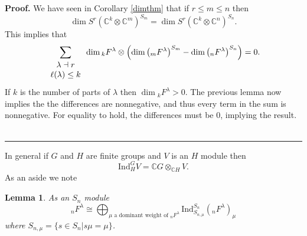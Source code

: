 \documentclass[12pt]{article}%
\newtheorem{lemma}[theorem]{Lemma}
\newenvironment{proof}[1][Proof]{\noindent\textbf{#1.} }{\ \rule{0.5em}{0.5em}}
\begin{document}
\begin{proof}
We have seen in Corollary \ref{dimthm} that if $r \leq m \leq n$ then
\[
\dim S^{r}(\mathbb{C}^{k}\otimes\mathbb{C}^{m})^{S_{m}}=\dim S^{r}%
(\mathbb{C}^{k}\otimes\mathbb{C}^{n})^{S_{n}}.
\]
This implies that%
\[
\sum_{%
\begin{array}
[c]{c}%
\lambda\dashv r\\
\ell(\lambda) \leq k
\end{array}
}\dim{}_{k}F^{\lambda}\otimes\left(  \dim\left(  {}_{m}F^{\lambda}\right)
^{S_{m}}-\dim\left(  {}_{n}F^{\lambda}\right)  ^{S_{n}}\right)  =0.
\]
If $k$ is the number of parts of $\lambda$ then $\dim{}_{k}F^{\lambda}>0$. The
previous lemma now implies the the differences are nonnegative, and thus every
term in the sum is nonnegative. For equality to hold, the differences must be
$0$, implying the result.
\end{proof}

In general if $G$ and $H$ are finite groups and $V$ is an $H$ module then
\[
\mathrm{Ind}_{H}^{G}V=\mathbb{C}G\otimes_{\mathbb{C}H}V.
\]
As an aside we note

\begin{lemma}
As an $S_{n}$ module%
\[
{}_{n}F^{\lambda}\cong\bigoplus_{\mu\text{ a dominant weight of }{}%
_{n}F^{\lambda}}\mathrm{Ind}_{S_{n,\mu}}^{S_{n}}({}_{n}F^{\lambda})_{\mu}%
\]
where $S_{n,\mu}=\{s\in S_{n}|s\mu=\mu\}$.
\end{lemma}
\end{document}
